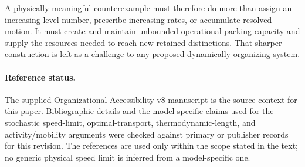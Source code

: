 \documentclass[11pt,a4paper]{article}
\theoremstyle{definition}
\numberwithin{equation}{section}
\begin{document}
A physically meaningful counterexample must therefore do more than assign an
increasing level number, prescribe increasing rates, or accumulate resolved
motion. It must create and maintain unbounded operational packing capacity and
supply the resources needed to reach new retained distinctions. That sharper
construction is left as a challenge to any proposed dynamically organizing
system.

\paragraph{Reference status.}
The supplied Organizational Accessibility v8 manuscript is the source context
for this paper. Bibliographic details and the model-specific claims used for
the stochastic speed-limit, optimal-transport, thermodynamic-length, and
activity/mobility arguments were checked against primary or publisher records
for this revision. The references are used only within the scope stated in the
text; no generic physical speed limit is inferred from a model-specific one.
\end{document}
